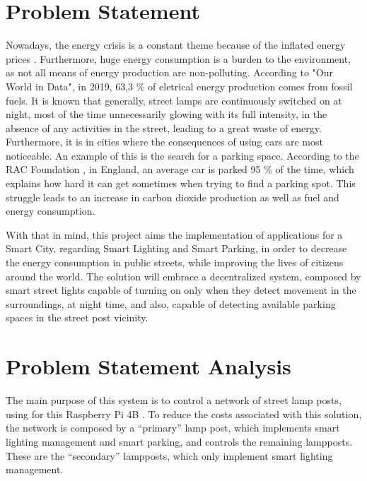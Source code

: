 \section{Problem Statement}
Nowadays, the energy crisis is a constant theme because of the inflated energy prices \cite{energy_crisis}. Furthermore, huge energy consumption is a burden to the environment, as not all means of energy production are non-polluting. According to "Our World in Data"\cite{owidenergy}, in 2019, 63,3 \% of eletrical energy production comes from fossil fuels. It is known that generally, street lamps are continuously switched on at night, most of the time unnecessarily glowing with its full intensity, in the absence of any activities in the street, leading to a great waste of energy. Furthermore, it is in cities where the consequences of using cars are most noticeable. An example of this is the search for a parking space. According to the RAC Foundation \cite{cars_parked}, in England, an average car is parked 95 \% of the time, which explains how hard it can get sometimes when trying to find a parking spot. This struggle leads to an increase in carbon dioxide production as well as fuel and energy consumption.

With that in mind, this project aims the implementation of applications for a Smart City, regarding Smart Lighting and Smart Parking, in order to decrease the energy consumption in public streets, while improving the lives of citizens around the world. The solution will embrace a decentralized system, composed by smart street lights capable of turning on only when they detect movement in the surroundings, at night time, and also, capable of detecting available parking spaces in the street post vicinity.

\clearpage
\section{Problem Statement Analysis}
The main purpose of this system is to control a network of street lamp posts, using for this Raspberry Pi 4B \cite{rasp_pi}. To reduce the costs associated with this solution, the network is composed by a “primary” lamp post, which implements smart lighting management and smart parking, and controls the remaining lampposts. These are the “secondary” lampposts, which only implement smart lighting management.

